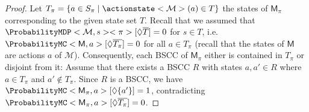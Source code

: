 \documentclass{theoretics}
\newcommand{\MC}{\mathsf{M}}
\newcommand{\MDP}{\mathcal{M}}
\newcommand{\States}{S}
\newcommand{\strategy}{\pi}
\newcommand{\reach}{\Diamond}
\newcommand{\targetset}{T}
\begin{document}
\begin{proof}
	Let $\targetset_\strategy = \{a \in \States_\strategy \mid \actionstate<\MDP>(a) \in \targetset \}$ the states of $\MC_\strategy$ corresponding to the given state set $\targetset$.
	Recall that we assumed that $\ProbabilityMDP<\MDP, s><\strategy>[\reach \overline{\targetset}] = 0$ for $s \in \targetset$, i.e.\ $\ProbabilityMC<\MC, a>[\reach \overline{\targetset_\strategy}] = 0$ for all $a \in \targetset_\strategy$ (recall that the states of $\MC$ are actions $a$ of $\MDP$).
	Consequently, each BSCC of $\MC_\strategy$ either is contained in $\targetset_\strategy$ or disjoint from it:
	Assume that there exists a BSCC $R$ with states $a, a' \in R$ where $a \in \targetset_\strategy$ and $a' \notin \targetset_\strategy$.
	Since $R$ is a BSCC, we have $\ProbabilityMC<\MC_\strategy, a>[\reach \{a'\}] = 1$, contradicting $\ProbabilityMC<\MC_\strategy, a>[\reach \overline{\targetset_\strategy}] = 0$.


\end{proof}
\end{document}
